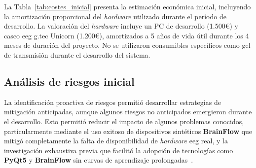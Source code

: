 \begin{table}[htbp!]
  \centering
  \caption{Estimación inicial de costes del proyecto con amortización de \textit{hardware} a 5 años}
  \label{tab:costes_inicial}
\end{table}

La Tabla~\ref{tab:costes_inicial} presenta la estimación económica inicial, incluyendo la amortización proporcional del \textit{hardware} utilizado durante el período de desarrollo. La valoración del \textit{hardware} incluye un PC de desarrollo (1.500€) y casco \acrshort{eeg} g.tec Unicorn (1.200€), amortizados a 5 años de vida útil durante los 4 meses de duración del proyecto. No se utilizaron consumibles específicos como gel de transmisión durante el desarrollo del sistema.

\subsection{Análisis de riesgos inicial}
\label{subsec:riesgos_inicial}

La identificación proactiva de riesgos permitió desarrollar estrategias de mitigación anticipadas, aunque algunos riesgos no anticipados emergieron durante el desarrollo. Esto permitió reducir el impacto de algunos problemas conocidos, particularmente mediante el uso exitoso de dispositivos sintéticos \textbf{BrainFlow} que mitigó completamente la falta de disponibilidad de \textit{hardware} \acrshort{eeg} real, y la investigación exhaustiva previa que facilitó la adopción de tecnologías como \textbf{PyQt5} y \textbf{BrainFlow} sin curvas de aprendizaje prolongadas~\cite{brainflow,pyqt5_docs}.

